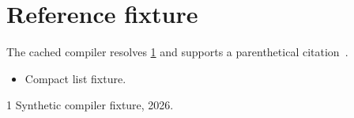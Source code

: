 \documentclass[twocolumn]{article}
\begin{document}
\section{Reference fixture}\label{sec:fixture}
The cached compiler resolves \cref{sec:fixture} and supports a
parenthetical citation~\citep{fixture}.
\begin{itemize}[nosep]
\item Compact list fixture.
\end{itemize}
\balance
\begin{thebibliography}{1}
 Synthetic compiler fixture, 2026.
\end{thebibliography}
\end{document}
